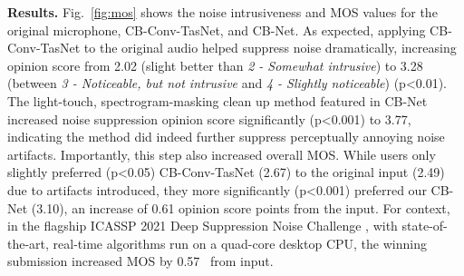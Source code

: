 \documentclass [11pt, proquest] {uwthesis}[2020/02/24]
\begin{document}
{\bf Results.} Fig.~\ref{fig:mos} shows the noise intrusiveness and MOS values for the original microphone, CB-Conv-TasNet, and CB-Net.
As expected, applying CB-Conv-TasNet to the original audio helped suppress noise dramatically, increasing opinion score from 2.02 (slight better than \textit{2 - Somewhat intrusive}) to 3.28 (between \textit{3 - Noticeable, but not intrusive} and \textit{4 - Slightly noticeable}) (p<0.01).
The light-touch, spectrogram-masking clean up method featured in CB-Net increased noise suppression opinion score significantly (p<0.001) to  3.77, indicating the method did indeed further suppress perceptually annoying noise artifacts.
Importantly, this step also increased overall MOS. While users only slightly preferred (p<0.05) CB-Conv-TasNet (2.67) to the original input (2.49) due to artifacts introduced, they more significantly (p<0.001) preferred our  CB-Net (3.10), an increase of 0.61 opinion score points from the input.
For context, in the  flagship ICASSP 2021 Deep Suppression Noise Challenge \cite{icaasp_dns}, with state-of-the-art, real-time algorithms run on a quad-core desktop CPU, the winning submission increased MOS by 0.57~\cite{icaasp_dns_results} from input.
\end{document}
